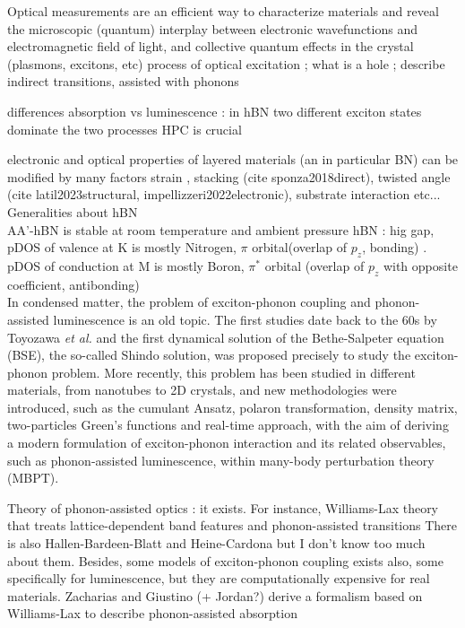 %
Optical measurements are an efficient way to characterize materials and reveal the microscopic (quantum) interplay between electronic wavefunctions and electromagnetic field of light, and collective quantum effects in the crystal (plasmons, excitons, etc)
%
process of optical excitation ; what is a hole ; describe indirect transitions, assisted with phonons

differences absorption vs luminescence : in hBN two different exciton states dominate the two processes
%
%
HPC is crucial
%

electronic and optical properties of layered materials (an in particular BN) can be modified by many factors
strain \cite{blundo2021strain}, stacking (cite sponza2018direct), twisted angle (cite latil2023structural, impellizzeri2022electronic), substrate interaction etc...\\


Generalities about hBN \\
AA'-hBN is stable at room temperature and ambient pressure
hBN : hig gap, pDOS of valence at K is mostly Nitrogen, $\pi$ orbital(overlap of $p_z$, bonding)  . pDOS of conduction at M is mostly Boron, $\pi^*$ orbital (overlap of $p_z$ with opposite coefficient, antibonding)\\

In condensed matter, the problem of exciton-phonon coupling and phonon-assisted luminescence is an old topic. The first studies date back to the 60s by Toyozawa \emph{et al.}\cite{toyozawa2003optical,toyozawa1964interband} and the first dynamical solution of the Bethe-Salpeter equation (BSE), the so-called Shindo solution, was proposed precisely to study the exciton-phonon problem.\cite{shindo1970effective}
More recently, this problem has been studied in different materials, from nanotubes\cite{perebeinos} to 2D crystals, and new methodologies were introduced, such as the cumulant Ansatz\cite{cudazzo2020first}, polaron transformation,\cite{feldtmann2009phonon} density matrix,\cite{brem2020phonon} two-particles Green's functions\cite{antonius2017theory} and real-time approach,\cite{paleari2022coupling} with the aim of deriving a modern formulation of exciton-phonon interaction and its related observables, such as phonon-assisted luminescence, within many-body perturbation theory (MBPT).

Theory of phonon-assisted optics : it exists. For instance, Williams-Lax theory that treats lattice-dependent band features and phonon-assisted transitions 
There is also Hallen-Bardeen-Blatt and Heine-Cardona but I don't know too much about them.
Besides, some models of exciton-phonon coupling exists also, some specifically for luminescence, but they are computationally expensive for real materials.
Zacharias and Giustino (+ Jordan?) derive a formalism based on Williams-Lax to describe phonon-assisted absorption 

